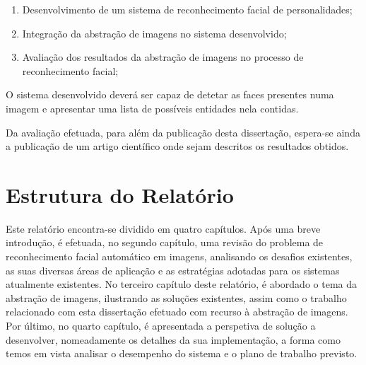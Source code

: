 \begin{enumerate}
\item Desenvolvimento de um sistema de reconhecimento facial de personalidades;
\item Integração da abstração de imagens no sistema desenvolvido;
\item Avaliação dos resultados da abstração de imagens no processo de reconhecimento facial;
\end{enumerate}

O sistema desenvolvido deverá ser capaz de detetar as faces presentes numa imagem e apresentar uma lista de possíveis entidades nela contidas.

Da avaliação efetuada, para além da publicação desta dissertação, espera-se ainda a publicação de um artigo científico onde sejam descritos os resultados obtidos.

\section{Estrutura do Relatório} \label{sec:struct}
Este relatório encontra-se dividido em quatro capítulos. Após uma breve introdução, é efetuada, no segundo capítulo, uma revisão do problema de reconhecimento facial automático em imagens, analisando os desafios existentes, as suas diversas áreas de aplicação e as estratégias adotadas para os sistemas atualmente existentes. No terceiro capítulo deste relatório, é abordado o tema da abstração de imagens, ilustrando as soluções existentes, assim como o trabalho relacionado com esta dissertação efetuado com  recurso à abstração de imagens. Por último, no quarto capítulo, é apresentada a perspetiva de solução a desenvolver, nomeadamente os detalhes da sua implementação, a forma como temos em vista analisar o desempenho do sistema e o plano de trabalho previsto.